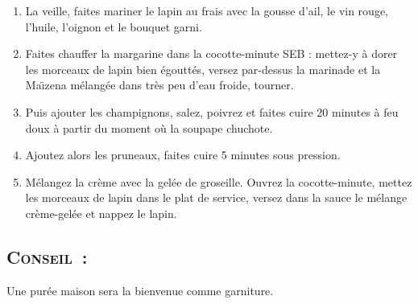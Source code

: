 \begin{enumerate}

\item La veille, faites mariner le lapin au frais avec la gousse d’ail, le vin rouge, l’huile, l’oignon et le bouquet garni.

\item Faites chauffer la margarine dans la cocotte-minute SEB : mettez-y \`a dorer les morceaux de lapin bien \'egoutt\'es, versez par-dessus la marinade et la Ma\"\i zena m\'elang\'ee dans tr\`es peu d’eau froide, tourner. 

\item Puis ajouter les champignons, salez, poivrez et faites cuire 20 minutes \`a feu doux \`a partir du moment où la soupape chuchote.

\item Ajoutez alors les pruneaux, faites cuire 5 minutes sous pression.

\item M\'elangez la cr\`eme avec la gel\'ee de groseille. Ouvrez la cocotte-minute, mettez les morceaux de lapin dans le plat de service, versez dans la sauce le m\'elange cr\`eme-gel\'ee et nappez le lapin.

\end{enumerate}
\subsection*{\textsc{Conseil~:}}

Une pur\'ee maison sera la bienvenue comme garniture.
